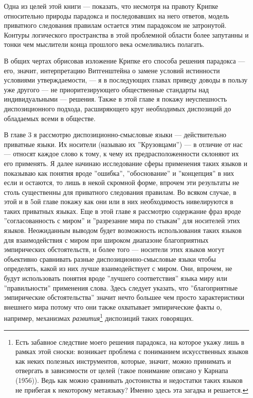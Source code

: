 \documentclass[12pt]{book}
\begin{document}
\smallskip

Одна из целей этой книги --- показать, что несмотря на правоту Крипке относительно природы парадокса и последовавших на него ответов, модель приватного следования правилам остается этим парадоксом не затронутой. Контуры логического пространства в этой проблемной области более запутанны и тонки чем мыслители конца прошлого века осмеливались полагать.

В общих чертах обрисовав изложение Крипке его способа решения парадокса --- его, значит, интерпретацию Витгенштейна о замене условий истинности условиями утверждаемости, --- я в последующих главах приведу доводы в пользу уже другого --- не приоритезирующего общественные стандарты над индивидуальными --- решения. Также в этой главе я покажу неуспешность диспозиционного подхода, расширяющего круг необходимых диспозиций до обладаемых всеми в обществе.

В главе 3 я рассмотрю диспозиционно-смысловые языки --- действительно приватные языки. Их носители (называю их ''Крузовцами'') --- в отличие от нас --- относят каждое слово к тому, к чему их предрасположенности склоняют их его применять. Я далее начинаю исследование сферы применения таких языков и показываю как понятия вроде ''ошибка'', ''обоснование'' и ''концепция'' в них если и остаются, то лишь в некой скромной форме, впрочем эти результаты не столь существенны для приватного следования правилам. Во всяком случае, в этой и в 5ой главе покажу как они или в них необходимость нивелируются в таких приватных языках. Еще в этой главе я рассмотрю содержание фраз вроде ''согласованность с миром'' и ''разрезание мира по стыкам'' для носителей этих языков. Неожиданным выводом будет возможность использования таких языков для взаимодействия с миром при широком диапазоне благоприятных эмпирических обстоятельств, и более того --- носители этих языков могут объективно сравнивать разные диспозиционно-смысловые языки чтобы определять, какой из них лучше взаимодействует с миром. Они, впрочем, не будут использовать понятия вроде ''лучшего соответствия'' языка миру или ''правильности'' применения слова. Здесь следует указать, что ''благоприятные эмпирические обстоятельства'' значит нечто большее чем просто характеристики внешнего мира потому что они также охватывает эмпирические факты о, например, механизмах \textit{развития}\footnote{Есть забавное следствие моего решения парадокса, на которое укажу лишь в рамках этой сноски: возникает проблема с пониманием искусственных языков как неких полезных инструментов, которые, значит, можно принимать и отвергать в зависимости от целей (такое понимание описано у Карнапа (1956)). Ведь как можно сравнивать достоинства и недостатки таких языков не прибегая к некоторому метаязыку? Именно здесь эта загадка и решается.} диспозиций таких говорящих.
\end{document}
